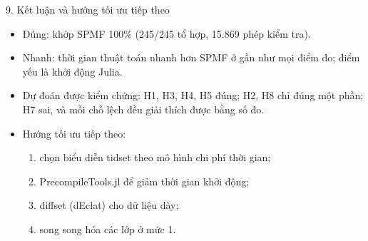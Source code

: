 \documentclass[aspectratio=169, 11pt]{beamer}
\begin{document}
\begin{frame}{9. Kết luận và hướng tối ưu tiếp theo}
\begin{itemize}
\item Đúng: khớp SPMF 100\% (245/245 tổ hợp, 15.869 phép kiểm tra).
\item Nhanh: thời gian thuật toán nhanh hơn SPMF ở gần như mọi điểm đo; điểm yếu là khởi động Julia.
\item Dự đoán được kiểm chứng: H1, H3, H4, H5 đúng; H2, H8 chỉ đúng một phần; H7 sai, và mỗi chỗ lệch đều giải thích được bằng số đo.
\item Hướng tối ưu tiếp theo:
  \begin{enumerate}
  \item chọn biểu diễn tidset theo mô hình chi phí thời gian;
  \item PrecompileTools.jl để giảm thời gian khởi động;
  \item diffset (dEclat) cho dữ liệu dày;
  \item song song hóa các lớp ở mức 1.
  \end{enumerate}
\end{itemize}
\end{frame}
\end{document}
